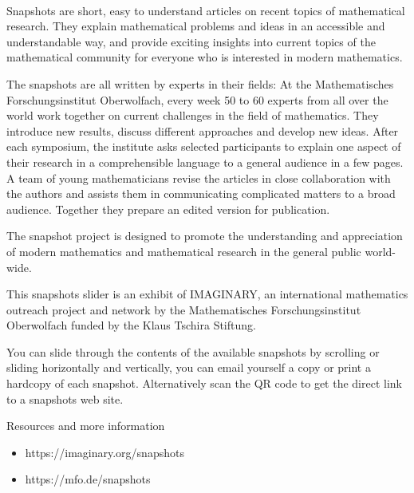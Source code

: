 \documentclass[10pt]{article}
\begin{document}
%
\pagecolor{black}%
\color{white}%
%
{\centering%
    \sffamily%
    \\[0.2cm]
}
\vfill

\noindent Snapshots are short, easy to understand articles on recent topics of mathematical research. They explain mathematical problems and ideas in an accessible and understandable way, and provide exciting insights into current topics of the mathematical community for everyone who is interested in modern mathematics.

The snapshots are all written by experts in their fields: At the Mathematisches Forschungsinstitut Oberwolfach, every week 50 to 60 experts from all over the world work together on current challenges in the field of mathematics. They introduce new results, discuss different approaches and develop new ideas. After each symposium, the institute asks selected participants to explain one aspect of their research in a comprehensible language to a general audience in a few pages. A team of young mathematicians revise the articles in close collaboration with the authors and assists them in communicating complicated matters to a broad audience. Together they prepare an edited version for publication.

The snapshot project is designed to promote the understanding and appreciation of modern mathematics and mathematical research in the general public world-wide.

This snapshots slider is an exhibit of IMAGINARY, an international mathematics outreach project and network by the Mathematisches Forschungsinstitut Oberwolfach funded by the Klaus Tschira Stiftung.

\vfill
\noindent{}
%
%
\noindent You can slide through the contents of the available snapshots by scrolling or sliding horizontally and vertically, you can email yourself a copy or print a hardcopy of each snapshot. Alternatively scan the QR code to get the direct link to a snapshots web site.
\vspace{4\bigskipamount}

\noindent Resources and more information
\begin{itemize}
    \item https://imaginary.org/snapshots
    \item https://mfo.de/snapshots
\end{itemize}
\bigskip
\bigskip
\end{document}
